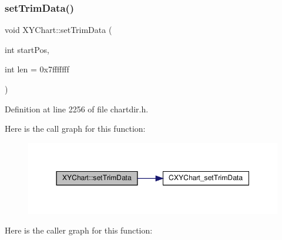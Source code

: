 \subsubsection{\texorpdfstring{set\+Trim\+Data()}{setTrimData()}}
{\footnotesize\ttfamily void X\+Y\+Chart\+::set\+Trim\+Data (\begin{DoxyParamCaption}\item[{int}]{start\+Pos,  }\item[{int}]{len = {\ttfamily 0x7fffffff} }\end{DoxyParamCaption})\hspace{0.3cm}{\ttfamily [inline]}}



Definition at line 2256 of file chartdir.\+h.

Here is the call graph for this function\+:
\nopagebreak
\begin{figure}[H]
\begin{center}
\leavevmode
\includegraphics[width=350pt]{class_x_y_chart_a3fed05334f9e4b6e0a9487dadd8cc5dd_cgraph}
\end{center}
\end{figure}
Here is the caller graph for this function\+:
\nopagebreak
